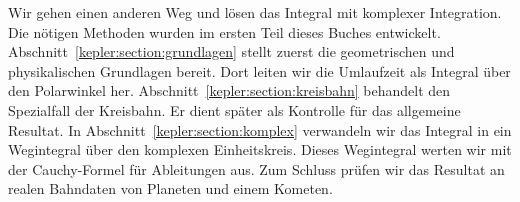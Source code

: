 Wir gehen einen anderen Weg und lösen das Integral mit komplexer Integration.
Die nötigen Methoden wurden im ersten Teil dieses Buches entwickelt.
Abschnitt~\ref{kepler:section:grundlagen} stellt zuerst die geometrischen und physikalischen Grundlagen bereit.
Dort leiten wir die Umlaufzeit als Integral über den Polarwinkel her.
Abschnitt~\ref{kepler:section:kreisbahn} behandelt den Spezialfall der Kreisbahn.
Er dient später als Kontrolle für das allgemeine Resultat.
In Abschnitt~\ref{kepler:section:komplex} verwandeln wir das Integral in ein Wegintegral über den komplexen Einheitskreis.
Dieses Wegintegral werten wir mit der Cauchy-Formel für Ableitungen aus.
Zum Schluss prüfen wir das Resultat an realen Bahndaten von Planeten und einem Kometen.
